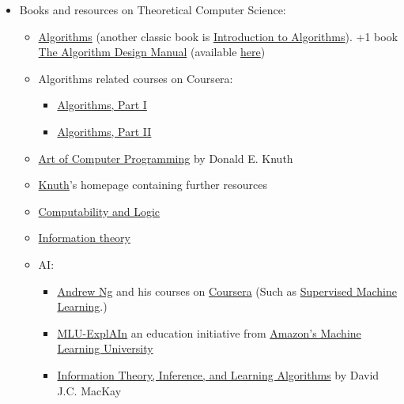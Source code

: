 \documentclass{article}
\begin{document}
\begin{itemize}
    \item Books and resources on Theoretical Computer Science:
    \begin{itemize}
    
        \item \href{https://www.goodreads.com/book/show/10803540-algorithms}{Algorithms} (another classic book is \href{https://www.goodreads.com/book/show/108986.Introduction_to_Algorithms}{Introduction to Algorithms}). +1 book \href{https://www.goodreads.com/book/show/425208.The_Algorithm_Design_Manual}{The Algorithm Design Manual} (available \href{https://mimoza.marmara.edu.tr/~msakalli/cse706_12/SkienaTheAlgorithmDesignManual.pdf}{here})
        \item Algorithms related courses on Coursera:
        \begin{itemize}
            \item \href{https://www.coursera.org/learn/algorithms-part1}{Algorithms, Part I}
            \item \href{https://www.coursera.org/learn/algorithms-part2}{Algorithms, Part II}
        \end{itemize}

        \item \href{https://cs.stanford.edu/~knuth/taocp.html}{Art of Computer Programming} by Donald E. Knuth

        \item \href{https://cs.stanford.edu/~knuth/}{Knuth}'s homepage containing further resources
        
        \item \href{https://www.goodreads.com/book/show/1556746.Computability_and_Logic}{Computability and Logic}
        
        \item \href{https://www.goodreads.com/book/show/433439.Elements_of_Information_Theory}{Information theory}
    
    \item AI:
    \begin{itemize}
        \item \href{https://www.andrewng.org/}{Andrew Ng} and his courses on \href{https://www.coursera.org/instructor/andrewng}{Coursera} (Such as \href{https://www.coursera.org/learn/machine-learning}{Supervised Machine Learning}.)
        \item \href{https://mlu-explain.github.io/}{MLU-ExplAIn} an education initiative from \href{https://aws.amazon.com/machine-learning/mlu/}{Amazon's Machine Learning University}
        \item \href{https://www.goodreads.com/book/show/201357.Information_Theory_Inference_and_Learning_Algorithms}{Information Theory, Inference, and Learning Algorithms} by David J.C. MacKay
        

\end{itemize}
\end{itemize}
\end{itemize}
\end{document}
